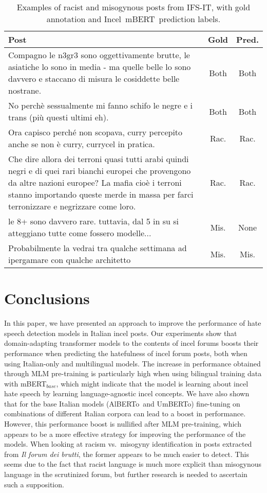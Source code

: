 \documentclass[
twocolumn,
]{ceurart}
\newcommand{\dsITclassification}{IFS-IT}
\newcommand{\mbert}{\mbox{mBERT$_{base}$}}
\newcommand{\imbert}{\mbox{Incel mBERT}}
\newcommand{\umbert}{\mbox{UmBERTo}}
\newcommand{\albert}{\mbox{AlBERTo}}
\newcommand{\itforum}{\textit{Il forum dei brutti}}
\begin{document}
\begin{table}
  \centering
  \caption{Examples of racist and misogynous posts from \dsITclassification, with gold annotation and \imbert\, prediction labels.}
  \label{tab:examples}
  \begin{tabular}{p{4.8cm}@{\hspace{1mm}}|c@{\hspace{1mm}}|c@{\hspace{1mm}}}
  \hline
  \bf Post & \bf Gold & \bf Pred. \\
  \hline
  Compagno le n3gr3 sono oggettivamente brutte, le asiatiche lo sono in media - ma quelle belle lo sono davvero e staccano di misura le cosiddette belle nostrane. & Both & Both \\
  \hline
  No perchè sessualmente mi fanno schifo le negre e i trans (più questi ultimi eh). & Both & Both \\
  \hline
  Ora capisco perché non scopava, curry percepito anche se non è curry, currycel in pratica. & Rac. & Rac. \\
  \hline
  Che dire allora dei terroni quasi tutti arabi quindi negri e di quei rari bianchi europei che provengono da altre nazioni europee? La mafia cioè i terroni stanno importando queste merde in massa per farci terronizzare e negrizzare come loro. & Rac. & Rac. \\
  \hline
  le 8+ sono davvero rare. tuttavia, dal 5 in su si atteggiano tutte come fossero modelle... & Mis. & None \\
  \hline
  Probabilmente la vedrai tra qualche settimana ad ipergamare con qualche architetto & Mis. & Mis. \\
  \hline
  \end{tabular}
\end{table}

\section{Conclusions}
\label{sec:conclusions}

In this paper, we have presented an approach to improve the performance of hate speech detection models in Italian incel posts.
Our experiments show that domain-adapting transformer models to the contents of incel forums boosts their performance when predicting the hatefulness of incel forum posts, both when using Italian-only and multilingual models. The increase in performance obtained through MLM pre-training is particularly high when using bilingual training data with \mbert, which might indicate that the model is learning about incel hate speech by learning language-agnostic incel concepts.
We have also shown that for the base Italian models (\albert\, and \umbert) fine-tuning on combinations of different Italian corpora can lead to a boost in performance. However, this performance boost is nullified after MLM pre-training, which appears to be a more effective strategy for improving the performance of the models. When looking at racism vs.\ misogyny identification in posts extracted from \itforum, the former appears to be much easier to detect. This seems due to the fact that racist language is much more explicit than misogynous language in the scrutinized forum, but further research is needed to ascertain such a supposition.
\end{document}
